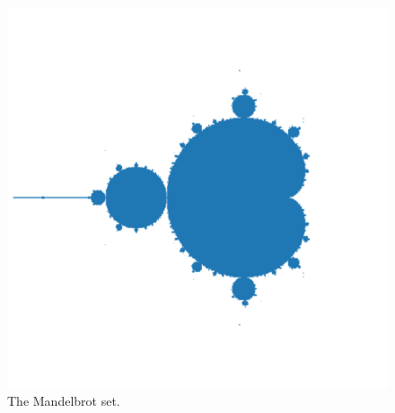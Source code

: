 \documentclass{article}
\begin{document}
\begin{figure}[ht!]
    \begin{centering}
        \includegraphics[width=0.4\linewidth]{mandelbrot.pdf}
        \caption{
            The Mandelbrot set.
        }
        \label{fig:mandelbrot}
    \end{centering}
\end{figure}
\end{document}
